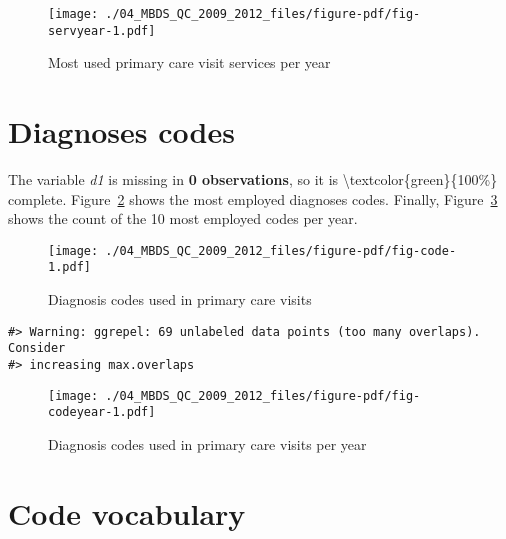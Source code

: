 \documentclass[
  letterpaper,
  DIV=11,
  numbers=noendperiod]{scrreprt}
\begin{document}
\begin{figure}

{\centering \texttt{[image: ./04\_MBDS\_QC\_2009\_2012\_files/figure-pdf/fig-servyear-1.pdf]}

}

\caption{\label{fig-servyear}Most used primary care visit services per
year}

\end{figure}

\hypertarget{diagnoses-codes}{%
\section{Diagnoses codes}\label{diagnoses-codes}}

The variable \emph{d1} is missing in \textbf{0 observations}, so it is
\textbackslash textcolor\{green\}\{100\%\} complete.
Figure~\ref{fig-code} shows the most employed diagnoses codes. Finally,
Figure~\ref{fig-codeyear} shows the count of the 10 most employed codes
per year.

\begin{figure}

{\centering \texttt{[image: ./04\_MBDS\_QC\_2009\_2012\_files/figure-pdf/fig-code-1.pdf]}

}

\caption{\label{fig-code}Diagnosis codes used in primary care visits}

\end{figure}

\begin{verbatim}
#> Warning: ggrepel: 69 unlabeled data points (too many overlaps). Consider
#> increasing max.overlaps
\end{verbatim}

\begin{figure}

{\centering \texttt{[image: ./04\_MBDS\_QC\_2009\_2012\_files/figure-pdf/fig-codeyear-1.pdf]}

}

\caption{\label{fig-codeyear}Diagnosis codes used in primary care visits
per year}

\end{figure}

\hypertarget{code-vocabulary}{%
\section{Code vocabulary}\label{code-vocabulary}}
\end{document}
